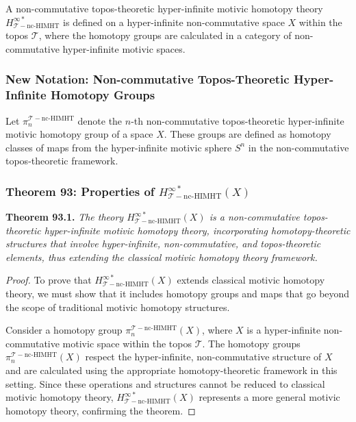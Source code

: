 \documentclass{article}
\begin{document}
A non-commutative topos-theoretic hyper-infinite motivic homotopy theory \(H_{\mathcal{T}-\text{nc-HIMHT}}^{\infty *}\) is defined on a hyper-infinite non-commutative space \(X\) within the topos \(\mathcal{T}\), where the homotopy groups are calculated in a category of non-commutative hyper-infinite motivic spaces.

\subsubsection{New Notation: Non-commutative Topos-Theoretic Hyper-Infinite Homotopy Groups}
Let \(\pi_n^{\mathcal{T}-\text{nc-HIMHT}}\) denote the \(n\)-th non-commutative topos-theoretic hyper-infinite motivic homotopy group of a space \(X\). These groups are defined as homotopy classes of maps from the hyper-infinite motivic sphere \(S^n\) in the non-commutative topos-theoretic framework.

\subsubsection{Theorem 93: Properties of \(H_{\mathcal{T}-\text{nc-HIMHT}}^{\infty *}(X)\)}
\textbf{Theorem 93.1.} \textit{The theory \(H_{\mathcal{T}-\text{nc-HIMHT}}^{\infty *}(X)\) is a non-commutative topos-theoretic hyper-infinite motivic homotopy theory, incorporating homotopy-theoretic structures that involve hyper-infinite, non-commutative, and topos-theoretic elements, thus extending the classical motivic homotopy theory framework.}

\begin{proof}
To prove that \(H_{\mathcal{T}-\text{nc-HIMHT}}^{\infty *}(X)\) extends classical motivic homotopy theory, we must show that it includes homotopy groups and maps that go beyond the scope of traditional motivic homotopy structures.

Consider a homotopy group \(\pi_n^{\mathcal{T}-\text{nc-HIMHT}}(X)\), where \(X\) is a hyper-infinite non-commutative motivic space within the topos \(\mathcal{T}\). The homotopy groups \(\pi_n^{\mathcal{T}-\text{nc-HIMHT}}(X)\) respect the hyper-infinite, non-commutative structure of \(X\) and are calculated using the appropriate homotopy-theoretic framework in this setting. Since these operations and structures cannot be reduced to classical motivic homotopy theory, \(H_{\mathcal{T}-\text{nc-HIMHT}}^{\infty *}(X)\) represents a more general motivic homotopy theory, confirming the theorem.
\end{proof}
\end{document}
